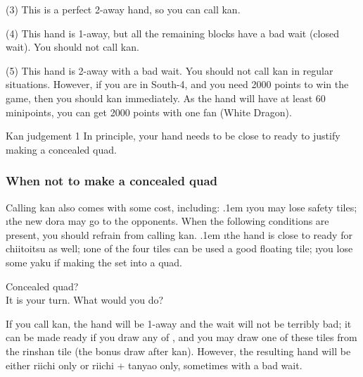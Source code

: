 \noindent (3) This is a perfect 2-away hand, so you can call {\jap kan}.

\noindent (4) This hand is 1-away, but all the remaining blocks have a bad wait (closed wait). You should not call {\jap kan}.

\noindent (5) This hand is 2-away with a bad wait. You should not call {\jap kan} in regular situations. However, if you are in South-4, and you need 2000 points to win the game, then you should {\jap kan} immediately. As the hand will have at least 60 minipoints, you can get 2000 points with one {\jap fan} (White Dragon). 

\bigskip
\begin{itembox}[c]{{\jap Kan} judgement 1}
In principle, your hand needs to be close to ready to justify making a concealed quad. 
\end{itembox}

\subsubsection{When not to make a concealed quad}

Calling {\jap kan} also comes with some cost, including:
\bi \itemsep.1em
\i you may lose safety tiles;
\i the new {\jap dora} may go to the opponents.
\ei
When the following conditions are present, you should refrain from calling {\jap kan}.
\bi \itemsep.1em
\i the hand is close to ready for {\jap chiitoitsu} as well;
\i one of the four tiles can be used a good floating tile;
\i you lose some {\jap yaku} if making the set into a quad.
\ei

\bigskip
\begin{itembox}[r]{Concealed quad?}
\bp
{}\\
\ep{}
\vspace{-10pt}It is your turn. What would you do?
\end{itembox}
\noindent
If you call {\jap kan}, the hand will be 1-away and the wait will not be terribly bad; it can be made ready if you draw any of {\large{}}, and you may draw one of these tiles from the {\jap rinshan} tile (the bonus draw after {\jap kan}). However, the resulting hand will be either {\jap riichi} only or {\jap riichi} + {\jap tanyao} only, sometimes with a bad wait. 

